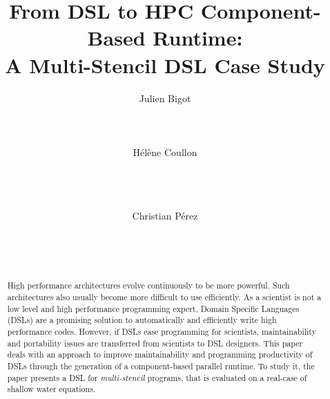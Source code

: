 \documentclass{sig-alternate}
\begin{document}

\title{From DSL to HPC Component-Based Runtime:\\ A Multi-Stencil DSL Case Study}

\author{
\alignauthor
Julien Bigot\\
       \\
       \\
       \\ %
\alignauthor
H\'el\`ene Coullon\\
       \\
       \\
       \\
\and
\alignauthor
Christian P\'erez\\
       \\
       \\
       \\
}

\maketitle
\begin{abstract}
  High performance architectures evolve continuously to be more powerful. Such architectures also usually become more difficult to use efficiently. As a scientist is not a low level and high performance programming expert, Domain Specific Languages (DSLs) are a promising solution to automatically and efficiently write high performance codes. However, if DSLs ease programming for scientists, maintainability and portability issues are transferred from scientists to DSL designers. This paper deals with an approach to improve maintainability and programming productivity of DSLs through the generation of a component-based parallel runtime. To study it, the paper presents a  DSL for \emph{multi-stencil} programs, that is evaluated on a real-case of shallow water equations.
\end{abstract}
\end{document}
